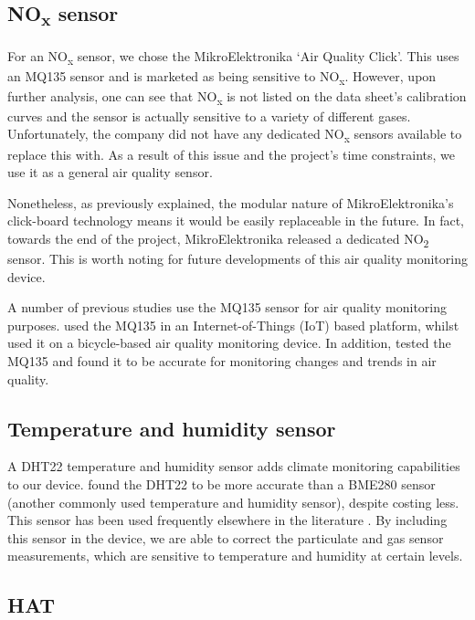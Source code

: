 \documentclass[11pt,twosided,a4paper]{report}
\begin{document}
\subsection{NO\textsubscript{x} sensor}

For an NO\textsubscript{x} sensor, we chose the MikroElektronika `Air Quality Click'. This uses an MQ135 sensor and is marketed as being sensitive to NO\textsubscript{x}. However, upon further analysis, one can see that NO\textsubscript{x} is not listed on the data sheet's calibration curves and the sensor is actually sensitive to a variety of different gases. Unfortunately, the company did not have any dedicated NO\textsubscript{x} sensors available to replace this with. As a result of this issue and the project's time constraints, we use it as a general air quality sensor.

Nonetheless, as previously explained, the modular nature of MikroElektronika's click-board technology means it would be easily replaceable in the future. In fact, towards the end of the project, MikroElektronika released a dedicated NO\textsubscript{2} sensor. This is worth noting for future developments of this air quality monitoring device.

A number of previous studies use the MQ135 sensor for air quality monitoring purposes. \cite{Rahman2017adaptivesensingRPi} used the MQ135 in an Internet-of-Things (IoT) based platform, whilst \cite{anderson2012noxdroid} used it on a bicycle-based air quality monitoring device. In addition, \cite{garnier2017mythorreality} tested the MQ135 and found it to be accurate for monitoring changes and trends in air quality.

\subsection{Temperature and humidity sensor}

A DHT22 temperature and humidity sensor adds climate monitoring capabilities to our device. \cite{garnier2017mythorreality} found the DHT22 to be more accurate than a BME280 sensor (another commonly used temperature and humidity sensor), despite costing less. This sensor has been used frequently elsewhere in the literature \citep{Rahman2017adaptivesensingRPi, ibrahim2015IOTenvmon, alkandari2018airqualityexperimental}. By including this sensor in the device, we are able to correct the particulate and gas sensor measurements, which are sensitive to temperature and humidity at certain levels.

\subsection{HAT}
\end{document}
